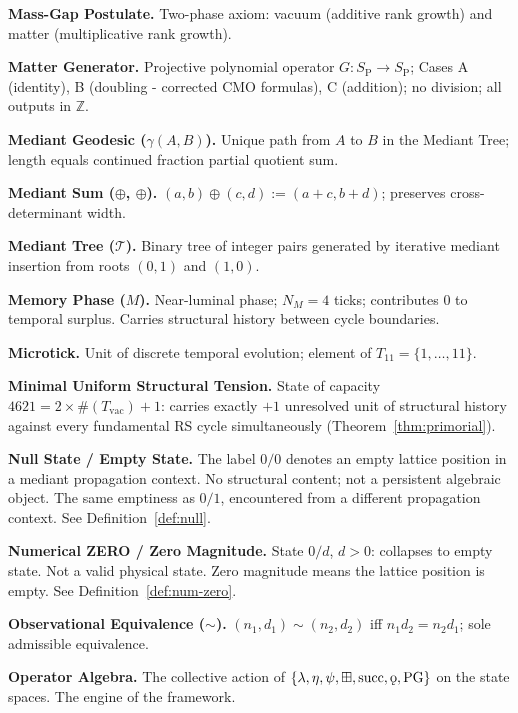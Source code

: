 \documentclass[11pt, letterpaper]{article}
\newcommand{\Z}{\mathbb{Z}}
\newcommand{\SP}{S_{\mathrm{P}}}
\newcommand{\lop}{\lambda}
\newcommand{\aop}{\eta}
\newcommand{\bplus}{\boxplus}
\newcommand{\med}{\oplus}
\renewcommand{\succ}{\operatorname{succ}}
\newcommand{\koppa}{\mathbin{\text{\rm\k{o}}}}
\newcommand{\Tcyc}{T_{11}}
\newcommand{\PG}{\mathrm{PG}}
\theoremstyle{definition}
\theoremstyle{plain}
\begin{document}
\medskip\noindent\textbf{Mass-Gap Postulate.}
Two-phase axiom: vacuum (additive rank growth) and matter (multiplicative
rank growth).

\medskip\noindent\textbf{Matter Generator.}
Projective polynomial operator $G:\SP\to\SP$; Cases A (identity), B
(doubling - corrected CMO formulas), C (addition); no division; all outputs
in $\Z$.

\medskip\noindent\textbf{Mediant Geodesic ($\gamma(A,B)$).}
Unique path from $A$ to $B$ in the Mediant Tree; length equals continued
fraction partial quotient sum.

\medskip\noindent\textbf{Mediant Sum ($\oplus$, $\med$).}
$(a,b)\med(c,d):=(a+c,b+d)$; preserves cross-determinant width.

\medskip\noindent\textbf{Mediant Tree ($\mathcal{T}$).}
Binary tree of integer pairs generated by iterative mediant insertion from
roots $(0,1)$ and $(1,0)$.

\medskip\noindent\textbf{Memory Phase ($M$).}
Near-luminal phase; $N_M=4$ ticks; contributes $0$ to temporal surplus.
Carries structural history between cycle boundaries.

\medskip\noindent\textbf{Microtick.}
Unit of discrete temporal evolution; element of $\Tcyc=\{1,\dots,11\}$.

\medskip\noindent\textbf{Minimal Uniform Structural Tension.}
State of capacity $4621=2\times\#(T_{\mathrm{vac}})+1$: carries exactly
$+1$ unresolved unit of structural history against every fundamental RS cycle
simultaneously (Theorem~\ref{thm:primorial}).

\medskip\noindent\textbf{Null State / Empty State.}
The label $0/0$ denotes an empty lattice position in a mediant propagation
context.  No structural content; not a persistent algebraic object.  The
same emptiness as $0/1$, encountered from a different propagation context.
See Definition~\ref{def:null}.

\medskip\noindent\textbf{Numerical ZERO / Zero Magnitude.}
State $0/d$, $d>0$: collapses to empty state.  Not a valid physical state.
Zero magnitude means the lattice position is empty.
See Definition~\ref{def:num-zero}.

\medskip\noindent\textbf{Observational Equivalence ($\sim$).}
$(n_1,d_1)\sim(n_2,d_2)$ iff $n_1 d_2=n_2 d_1$; sole admissible equivalence.

\medskip\noindent\textbf{Operator Algebra.}
The collective action of $\{\lop,\aop,\psi,\bplus,\succ,\koppa,\PG\}$
on the state spaces.  The engine of the framework.
\end{document}
